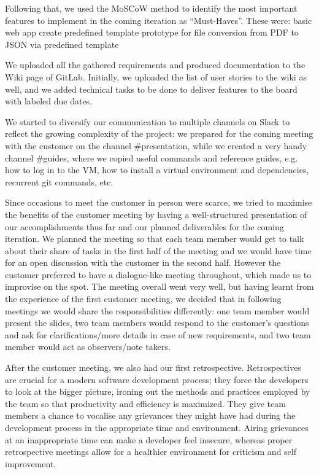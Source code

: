 \documentclass{l3proj}
\begin{document}
Following that, we used the MoSCoW method to identify the most important features to implement in the coming iteration as “Must-Haves”. These were: 
basic web app
create predefined template
prototype for file conversion from PDF to JSON via predefined template

We uploaded all the gathered requirements and produced documentation to the Wiki page of GitLab.  Initially, we uploaded the list of user stories to the wiki as well, and we added technical tasks to be done to deliver features to the board with labeled due dates.

We started to diversify our communication to multiple channels on Slack to reflect the growing complexity of the project: we prepared for the coming meeting with the customer on the channel #presentation, while we created a very handy channel #guides, where we copied useful commands and reference guides, e.g. how to log in to the VM, how to install a virtual environment and dependencies, recurrent git commands, etc.

Since occasions to meet the customer in person were scarce, we tried to maximise the benefits of the customer meeting by having a well-structured presentation of our accomplishments thus far and our planned deliverables for the coming iteration. We planned the meeting so that each team member would get to talk about their share of tasks in the first half of the meeting and we would have time for an open discussion with the customer in the second half. However the customer preferred to have a dialogue-like meeting throughout, which made us to improvise on the spot. The meeting overall went very well, but having learnt from the experience of the first customer meeting, we decided that in following meetings we would share the responsibilities differently: one team member would present the slides, two team members would respond to the customer’s questions and ask for clarifications/more details in case of new requirements, and two team member would act as observers/note takers.

After the customer meeting, we also had our first retrospective. Retrospectives are crucial for a modern software development process; they force the developers to look at the bigger picture, ironing out the methods and practices employed by the team so that productivity and efficiency is maximized. They give team members a chance to vocalise any grievances they might have had during the development process in the appropriate time and environment. Airing grievances at an inappropriate time can make a developer feel insecure, whereas proper retrospective meetings allow for a healthier environment for criticism and self improvement.
\end{document}

